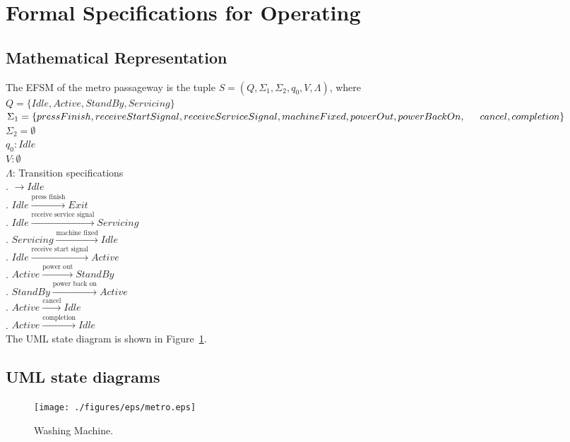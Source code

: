 \newpage
\section{Formal Specifications for Operating}

\subsection{Mathematical Representation}

\noindent The EFSM of the metro passageway is the tuple $S = (Q, \Sigma_1, \Sigma_2, q_0, V, \Lambda)$, where\\

\noindent $Q = \{Idle, Active, StandBy, Servicing\}$\\
\noindent $\Sigma_1 = \{press Finish, receive Start Signal, receive Service Signal, machine Fixed, power Out, power Back On, \\
\indent cancel, completion\}$\\
\noindent $\Sigma_2 = \emptyset$\\
\noindent $q_0: Idle$\\
\noindent $V: \emptyset$\\
\noindent $\Lambda$: Transition specifications\\
. $\rightarrow Idle$\\
. $Idle \xrightarrow {\text {press finish}} Exit$\\
. $Idle \xrightarrow {\text {receive service signal}} Servicing$\\
. $Servicing \xrightarrow {\text {machine fixed}} Idle$\\
. $Idle \xrightarrow {\text {receive start signal}} Active$\\
. $Active \xrightarrow {\text {power out}} StandBy$\\
. $StandBy \xrightarrow {\text {power back on}} Active$\\
. $Active \xrightarrow {\text {cancel}} Idle$\\
. $Active \xrightarrow {\text {completion}} Idle$\\

\noindent The UML state diagram is shown in Figure~\ref{fig:operating}.

\newpage

\subsection{UML state diagrams}

\begin{figure}[h!]
	\centering
		\texttt{[image: ./figures/eps/metro.eps]}
		  \caption{Washing Machine.}
  \label{fig:operating}
\end{figure}